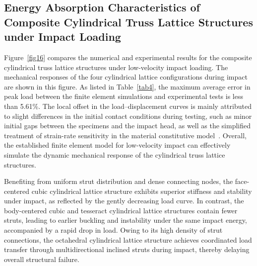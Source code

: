 \documentclass[12pt,a4paper]{article}
\begin{document}
\subsection{Energy Absorption Characteristics of Composite Cylindrical Truss Lattice Structures under Impact Loading}

Figure~\ref{fig16} compares the numerical and experimental results for the composite cylindrical truss lattice structures under low-velocity impact loading. The mechanical responses of the four cylindrical lattice configurations during impact are shown in this figure. As listed in Table~\ref{tab4}, the maximum average error in peak load between the finite element simulations and experimental tests is less than 5.61\%. The local offset in the load--displacement curves is mainly attributed to slight differences in the initial contact conditions during testing, such as minor initial gaps between the specimens and the impact head, as well as the simplified treatment of strain-rate sensitivity in the material constitutive model~\cite{Ref51,Ref52}. Overall, the established finite element model for low-velocity impact can effectively simulate the dynamic mechanical response of the cylindrical truss lattice structures.

Benefiting from uniform strut distribution and dense connecting nodes, the face-centered cubic cylindrical lattice structure exhibits superior stiffness and stability under impact, as reflected by the gently decreasing load curve. In contrast, the body-centered cubic and tesseract cylindrical lattice structures contain fewer struts, leading to earlier buckling and instability under the same impact energy, accompanied by a rapid drop in load. Owing to its high density of strut connections, the octahedral cylindrical lattice structure achieves coordinated load transfer through multidirectional inclined struts during impact, thereby delaying overall structural failure.
\end{document}
